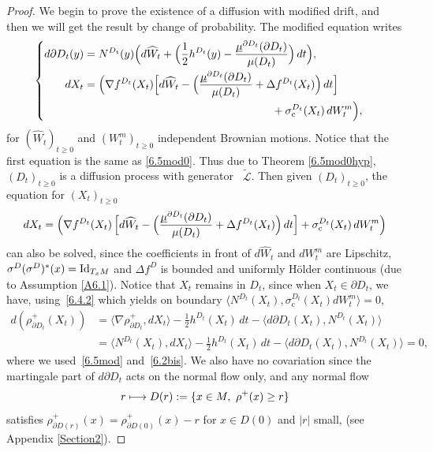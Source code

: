 \documentclass[10pt]{amsart}
\newcommand\mto{\mathchoice{\longmapsto}{\mapsto}{\mapsto}{\mapsto}}
\theoremstyle{plain}
\theoremstyle{definition}
\newcommand{\SL}{{\mathscr L}}
\newcommand{\usm}{{\underline{\smash{\mu}}}}
\let\f\frac
\let\D\Delta
\let\n\nabla
\let\s\sigma
\let\wi\widetilde
\begin{document}
\begin{proof}
We begin to prove the existence of a diffusion with modified drift, and then we will get the result by change of probability. The modified equation writes
\begin{equation}
\label{6.5mod}
\begin{cases}
\begin{aligned}
d\partial D_t(y)&=N^{D_t}(y)\Bigl(d\widehat W_t+ \Bigl(\f12 h^{D_t}(y)-\f{\usm^{\partial D_t}(\partial D_t)}{\mu(D_t)} \Bigr)\,dt \Bigr),\\
dX_t&= \Bigl(\n f^{D_t}(X_t) \Bigl[ d\widehat W_t-\Bigl(\f{\usm^{\partial D_t}(\partial D_t)}{\mu(D_t)}+\Delta f^{D_t}(X_t) \Bigr)\, dt \Bigr]\\&\hspace*{6cm}+ \sigma_{\mathrm c}^{D_t}(X_t)\, dW_t^m \Bigr),
\end{aligned}
\end{cases}
\end{equation}
for $(\widehat W_t)_{t\geq 0}$ and $(W_t^m)_{t\geq 0}$ independent Brownian motions.
Notice that the first equation is the same as \eqref{6.5mod0}. Thus due to Theorem \ref{6.5mod0hyp}, $(D_t)_{t\geq 0}$ is a diffusion process with generator ~$\wi\SL$.
Then given $(D_t)_{t\geq 0}$, the equation for $(X_t)_{t\geq 0}$
\begin{equation}
dX_t= \Bigl(\n f^{D_t}(X_t) \, \Bigl[ d\widehat W_t-\Bigl(\f{\usm^{\partial D_t}(\partial D_t)}{\mu(D_t)}+\Delta f^{D_t}(X_t) \Bigr)\, dt \Bigr]
+ \sigma_{\mathrm c}^{D_t}(X_t)\, dW_t^m \Bigr)
\end{equation}
can also be solved, since the coefficients in front of $d\widehat W_t$ and $dW_t^m$ are Lipschitz,
$\s^D(\s^D)^\ast(x)={\rm Id}_{T_xM}$ and $\D f^D$ is bounded and uniformly Hölder continuous (due to Assumption \ref{A6.1}).
Notice that $X_t$ remains in $D_t$, since when $X_t\in \partial D_t$, we have, using~\eqref{6.4.2} which yields on boundary $\langle N^{D_t}(X_t), \sigma_{\mathrm c}^{D_t}(X_t) dW_t^m\rangle=0$,
\begin{equation}%
\begin{split}
d(\rho^+_{\partial D_t}(X_t))&=\langle \n\rho^+_{\partial D_t},dX_t\rangle -\f{1}2h^{{D_t}}(X_t)\,dt-\langle d\partial D_t(X_t), N^{D_t}(X_t)\rangle\\
&=\langle N^{D_t}(X_t),dX_t\rangle -\f{1}2h^{{D_t}}(X_t)\,dt-\langle d\partial D_t(X_t), N^{D_t}(X_t)\rangle=0,
\end{split}
\end{equation}
where we used~\eqref{6.5mod} and~\eqref{6.2bis}. We also {have no covariation since} the martingale part of $d\partial D_t$ acts on the normal flow only, and any normal flow
\[
r\mto D(r):=\{x\in M,\ \rho^+(x)\ge r\}
\]
satisfies $\rho^+_{\partial D(r)}(x)=\rho^+_{\partial D(0)}(x)-r$ for $x\in D(0)$ and $|r|$ small, (see Appendix \ref{Section2}).


\end{proof}
\end{document}
